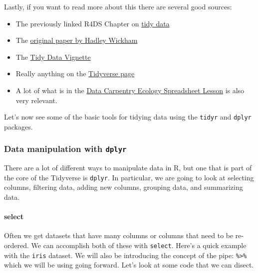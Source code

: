 \documentclass[]{article}
\newenvironment{Shaded}{\begin{snugshade}}{\end{snugshade}}
\newcommand{\CommentTok}[1]{\textcolor[rgb]{0.56,0.35,0.01}{\textit{#1}}}
\newcommand{\KeywordTok}[1]{\textcolor[rgb]{0.13,0.29,0.53}{\textbf{#1}}}
\newcommand{\NormalTok}[1]{#1}
\newcommand{\OperatorTok}[1]{\textcolor[rgb]{0.81,0.36,0.00}{\textbf{#1}}}
\newcommand{\StringTok}[1]{\textcolor[rgb]{0.31,0.60,0.02}{#1}}
\providecommand{\tightlist}{%
  \setlength{\itemsep}{0pt}\setlength{\parskip}{0pt}}
\let\oldparagraph\paragraph
\renewcommand{\paragraph}[1]{\oldparagraph{#1}\mbox{}}
\begin{document}
Lastly, if you want to read more about this there are several good
sources:

\begin{itemize}
\tightlist
\item
  The previously linked R4DS Chapter on
  \href{http://r4ds.had.co.nz/tidy-data.html}{tidy data}
\item
  The \href{https://www.jstatsoft.org/article/view/v059i10}{original
  paper by Hadley Wickham}
\item
  The \href{http://tidyr.tidyverse.org/articles/tidy-data.html}{Tidy
  Data Vignette}
\item
  Really anything on the \href{https://www.tidyverse.org/}{Tidyverse
  page}
\item
  A lot of what is in the
  \href{https://datacarpentry.org/spreadsheet-ecology-lesson/}{Data
  Carpentry Ecology Spreadsheet Lesson} is also very relevant.
\end{itemize}

Let's now see some of the basic tools for tidying data using the
\texttt{tidyr} and \texttt{dplyr} packages.

\hypertarget{data-manipulation-with-dplyr}{%
\subsubsection{\texorpdfstring{Data manipulation with
\texttt{dplyr}}{Data manipulation with dplyr}}\label{data-manipulation-with-dplyr}}

There are a lot of different ways to manipulate data in R, but one that
is part of the core of the Tidyverse is \texttt{dplyr}. In particular,
we are going to look at selecting columns, filtering data, adding new
columns, grouping data, and summarizing data.

\hypertarget{select}{%
\paragraph{select}\label{select}}

Often we get datasets that have many columns or columns that need to be
re-ordered. We can accomplish both of these with \texttt{select}. Here's
a quick example with the \texttt{iris} dataset. We will also be
introducing the concept of the pipe: \texttt{\%\textgreater{}\%} which
we will be using going forward. Let's look at some code that we can
disect.

\begin{Shaded}
\end{Shaded}
\end{document}

